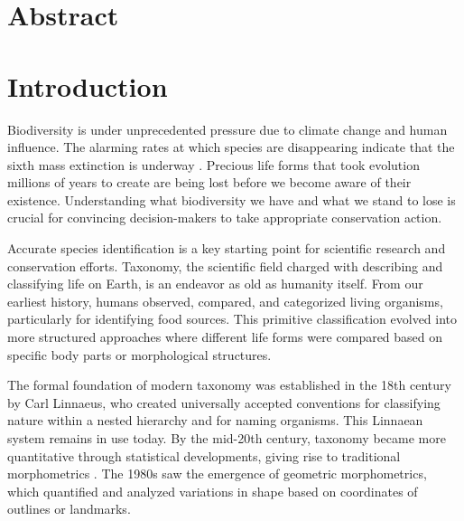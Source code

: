 \documentclass[a4paper,12pt]{article}
\begin{document}
\newpage
\section*{\centering \normalsize{Abstract}}


\newpage
\tableofcontents

\newpage
\listoffigures

\newpage
\listoftables

\newpage
\cleardoublepage %
\setcounter{page}{1} %

\section{Introduction}

Biodiversity is under unprecedented pressure due to climate change and human influence. The alarming rates at which species are disappearing indicate that the sixth mass extinction is underway \citep{Ceballos2017}. Precious life forms that took evolution millions of years to create are being lost before we become aware of their existence. Understanding what biodiversity we have and what we stand to lose is crucial for convincing decision-makers to take appropriate conservation action.

Accurate species identification is a key starting point for scientific research and conservation efforts. Taxonomy, the scientific field charged with describing and classifying life on Earth, is an endeavor as old as humanity itself. From our earliest history, humans observed, compared, and categorized living organisms, particularly for identifying food sources. This primitive classification evolved into more structured approaches where different life forms were compared based on specific body parts or morphological structures.

The formal foundation of modern taxonomy was established in the 18th century by Carl Linnaeus, who created universally accepted conventions for classifying nature within a nested hierarchy and for naming organisms. This Linnaean system remains in use today. By the mid-20th century, taxonomy became more quantitative through statistical developments, giving rise to traditional morphometrics \citep{Marcus1990}. The 1980s saw the emergence of geometric morphometrics, which quantified and analyzed variations in shape based on coordinates of outlines or landmarks\citep{Rohlf1993}.
\end{document}
